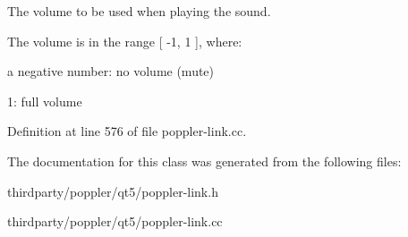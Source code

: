 The volume to be used when playing the sound.

The volume is in the range \mbox{[} -\/1, 1 \mbox{]}, where\+:
\begin{DoxyItemize}
\item a negative number\+: no volume (mute)
\item 1\+: full volume 
\end{DoxyItemize}

Definition at line 576 of file poppler-\/link.\+cc.



The documentation for this class was generated from the following files\+:\begin{DoxyCompactItemize}
\item 
thirdparty/poppler/qt5/poppler-\/link.\+h\item 
thirdparty/poppler/qt5/poppler-\/link.\+cc\end{DoxyCompactItemize}
